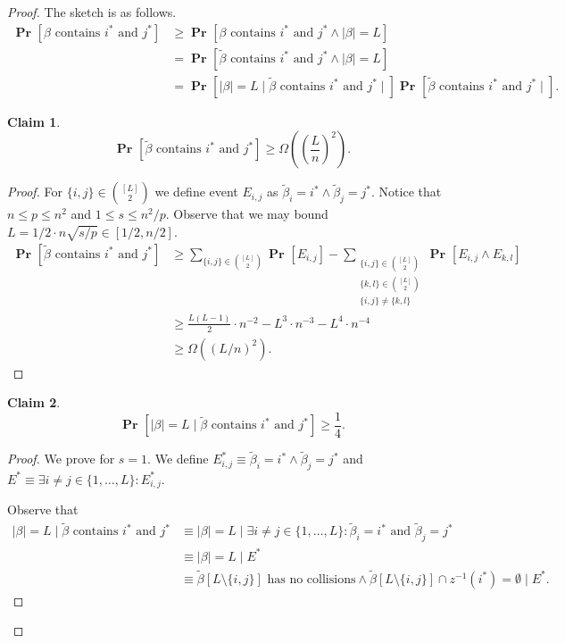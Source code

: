 \documentclass{article}
\newcommand{\probs}[2]{\operatorname{\mathbf{Pr}}_{{#1}}\left[{#2}\right]}
\newcommand{\prob}[1]{\probs{}{#1}}
\newtheorem{claim}{Claim}
\begin{document}
\begin{proof}
The sketch is as follows.
\begin{align*}
    \prob{\beta\mbox{ contains }i^{*}\mbox{ and }j^{*}} 
        & \geq \prob{\beta\mbox{ contains }i^{*}\mbox{ and }j^{*} \wedge |\beta| = L} \\
        & = \prob{\tilde{\beta}\mbox{ contains }i^{*}\mbox{ and }j^{*} \wedge |\beta| = L} \\
        & = \prob{|\beta| = L \mid \tilde \beta\mbox{ contains }i^{*}\mbox{ and }j^{*} \mid}\prob{\tilde \beta\mbox{ contains }i^{*}\mbox{ and }j^{*} \mid}.
\end{align*}


\begin{claim}
\[ \prob{\tilde \beta\mbox{ contains }i^{*}\mbox{ and }j^{*}} \geq \Omega\left(\left(\frac{L}{n}\right)^2\right). \]
\end{claim}
\begin{proof}
For $\{i, j\} \in \binom{[L]}{2}$ we define event $E_{i, j}$ as $\tilde \beta_i = i^* \wedge \tilde \beta_j = j^*$.
Notice that $n \leq p \leq n^2$ and $1 \leq s \leq n^2/p$.
Observe that we may bound $L = 1/2 \cdot n\sqrt{s/p} \in [1/2, n/2]$.
\begin{align*}
    \prob{\tilde \beta\mbox{ contains }i^{*}\mbox{ and }j^{*}} 
        & \geq \sum_{\{i, j\} \in \binom{[L]}{2}} \prob{E_{i, j}} - \sum_{\substack{\{i, j\} \in \binom{[L]}{2} \\ \{k, l\} \in \binom{[L]}{2} \\ \{i, j\} \neq \{k, l\}}} \prob{E_{i, j} \wedge E_{k, l}} \\
        & \geq \frac{L(L-1)}{2} \cdot n^{-2} - L^3 \cdot n^{-3} - L^4 \cdot n^{-4} \\
        & \geq \Omega\left((L/n)^2\right).
\end{align*}
\end{proof}

\begin{claim}
\[ \prob{|\beta| = L \mid \tilde \beta\mbox{ contains }i^{*}\mbox{ and }j^{*}} \geq \frac{1}{4}. \]
\end{claim}
\begin{proof}
We prove for $s = 1$. We define $E^{*}_{i, j} \equiv \tilde \beta_i = i^{*} \wedge \tilde \beta_j = j^{*}$ and $E^{*} \equiv \exists i \neq j \in \{1, \dots, L\} \colon E^{*}_{i, j}$.

Observe that
\begin{align*}
|\beta| = L \mid \tilde \beta\mbox{ contains }i^{*}\mbox{ and }j^{*} 
    & \equiv |\beta| = L \mid \exists i \neq j \in \{1, \dots, L\} \colon \tilde \beta_i = i^{*}\mbox{ and } \tilde \beta_j = j^{*} \\
    & \equiv |\beta| = L \mid E^{*} \\
    & \equiv \tilde \beta[L \setminus \{i, j\}] \mbox{ has no collisions} \wedge \tilde \beta[L \setminus \{i, j\}] \cap z^{-1}(i^{*}) = \emptyset \mid E^{*}.
\end{align*}


\end{proof}
\end{proof}
\end{document}
